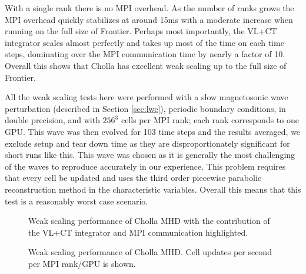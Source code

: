 With a single rank there is no MPI overhead. As the number of ranks grows the MPI overhead quickly stabilizes at around 15ms with a moderate increase when running on the full size of Frontier. Perhaps most importantly, the VL+CT integrator scales almost perfectly and takes up most of the time on each time steps, dominating over the MPI communication time by nearly a factor of 10. Overall this shows that Cholla has excellent weak scaling up to the full size of Frontier.

All the weak scaling tests here were performed with a slow magnetosonic wave perturbation (described in Section \ref{sec:lwc}), periodic boundary conditions, in double precision, and with $256^3$ cells per MPI rank; each rank corresponds to one GPU. This wave was then evolved for 103 time steps and the results averaged, we exclude setup and tear down time as they are disproportionately significant for short runs like this. This wave was chosen as it is generally the most challenging of the waves to reproduce accurately in our experience. This problem requires that every cell be updated and uses the third order piecewise parabolic reconstruction method in the characteristic variables. Overall this means that this test is a reasonably worst case scenario.



\begin{figure}[ht!]
    \caption{Weak scaling performance of Cholla MHD with the contribution of the VL+CT integrator and MPI communication highlighted.  }
    \label{fig:scaling-ms-per-gpu}
\end{figure}

\begin{figure}[ht!]
    \caption{Weak scaling performance of Cholla MHD. Cell updates per second per MPI rank/GPU is shown.  }
    \label{fig:scaling-cells-per-second}
\end{figure}

